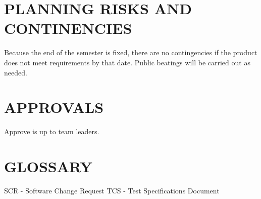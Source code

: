 \documentclass[report]{article}
\begin{document}
\section[PLANNING RISKS AND CONTINGENCIES]{PLANNING RISKS AND CONTINENCIES}
Because the end of the semester is fixed, there are no contingencies if the product does not meet requirements by that date. Public beatings will be carried out as needed.

\section[APPROVALS]{APPROVALS}
Approve is up to team leaders.

\section[GLOSSARY]{GLOSSARY}
SCR - Software Change Request
TCS - Test Specifications Document
\end{document}
